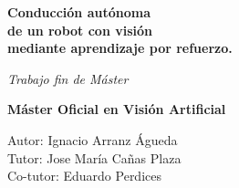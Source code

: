 
\begin{titlepage}
	
	
	\thispagestyle{frontpage}
	
	\begin{center}
		
		\vspace*{6\baselineskip}
	
	    \vspace{8\baselineskip}
		 
		{\Huge \textbf{Conducción autónoma\\
		               \vspace*{0,5\baselineskip}de un robot con visión\\
		               \vspace*{0,8\baselineskip}mediante aprendizaje por refuerzo.}}
		
		\large{\textit{Trabajo fin de Máster}}\\
		
        \vspace*{3,5\baselineskip}

		\large{\textbf{Máster Oficial en Visión Artificial}}\\

		\vspace{8,5\baselineskip}
		
		\large{Autor: Ignacio Arranz Águeda}\\
		\large{Tutor: Jose María Cañas Plaza}\\
		\large{Co-tutor: Eduardo Perdices}\\

	\end{center}
	
	\vspace*{4\baselineskip}
\end{titlepage}
